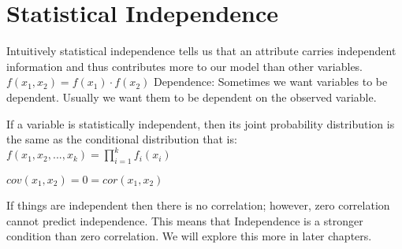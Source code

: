 \section{Statistical Independence}

Intuitively statistical independence tells us that an attribute carries independent information and thus contributes more to our model than other variables.
$f(x_1,x_2) = f(x_1) \cdot f(x_2)$
Dependence: Sometimes we want variables to be dependent. Usually we want them to be dependent on the observed variable.

If a variable is statistically independent, then its joint probability distribution is the same as the conditional distribution that is: 
$f(x_1,x_2,...,x_k) = \prod_{i=1}^{k}f_i(x_i)$

$cov(x_1,x_2) = 0 = cor(x_1,x_2)$

If things are independent then there is no correlation; however, zero correlation cannot predict independence. This means that Independence is a stronger condition than zero correlation. We will explore this more in later chapters.